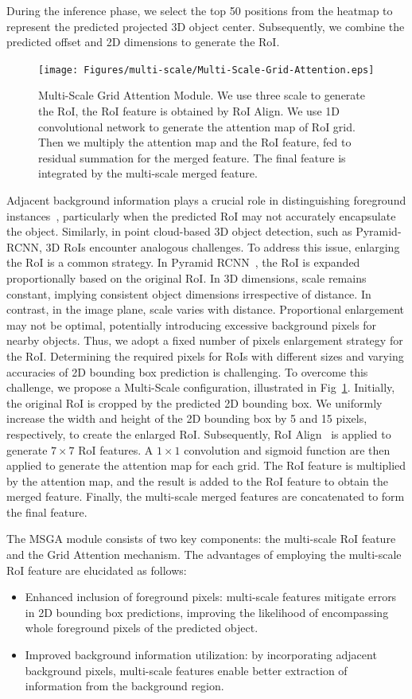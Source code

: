 \documentclass[journal]{IEEEtran}
\begin{document}
	During the inference phase, we select the top 50 positions from the heatmap to represent the predicted projected 3D object center. Subsequently, we combine the predicted offset and 2D dimensions to generate the RoI.
	\begin{figure}
	\centering
	\texttt{[image: Figures/multi-scale/Multi-Scale-Grid-Attention.eps]}
	\caption{Multi-Scale Grid Attention Module. We use three scale to generate the RoI, the RoI feature is obtained by RoI Align. We use 1D convolutional network to generate the attention map of RoI grid. Then we multiply the attention map and the RoI feature, fed to residual summation for the merged feature. The final feature is integrated by the multi-scale merged feature.} 
	\label{fig:multi-scale-grid-attention}
\end{figure}
	Adjacent background information plays a crucial role in distinguishing foreground instances~\cite{pyramid-rcnn}, particularly when the predicted RoI may not accurately encapsulate the object. Similarly, in point cloud-based 3D object detection, such as Pyramid-RCNN, 3D RoIs encounter analogous challenges. To address this issue, enlarging the RoI is a common strategy. In Pyramid RCNN~\cite{pyramid-rcnn}, the RoI is expanded proportionally based on the original RoI. In 3D dimensions, scale remains constant, implying consistent object dimensions irrespective of distance. In contrast, in the image plane, scale varies with distance. Proportional enlargement may not be optimal, potentially introducing excessive background pixels for nearby objects. Thus, we adopt a fixed number of pixels enlargement strategy for the RoI. Determining the required pixels for RoIs with different sizes and varying accuracies of 2D bounding box prediction is challenging. To overcome this challenge, we propose a Multi-Scale configuration, illustrated in Fig~\ref{fig:multi-scale-grid-attention}. Initially, the original RoI is cropped by the predicted 2D bounding box. We uniformly increase the width and height of the 2D bounding box by 5 and 15 pixels, respectively, to create the enlarged RoI. Subsequently, RoI Align~\cite{mask-rcnn} is applied to generate $7\times 7$ RoI features. A $1\times 1$ convolution and sigmoid function are then applied to generate the attention map for each grid. The RoI feature is multiplied by the attention map, and the result is added to the RoI feature to obtain the merged feature. Finally, the multi-scale merged features are concatenated to form the final feature.

	The MSGA module consists of two key components: the multi-scale RoI feature and the Grid Attention mechanism. The advantages of employing the multi-scale RoI feature are elucidated as follows:
	\begin{itemize}
		\item Enhanced inclusion of foreground pixels: multi-scale features mitigate errors in 2D bounding box predictions, improving the likelihood of encompassing whole foreground pixels of the predicted object.
		\item Improved background information utilization: by incorporating adjacent background pixels, multi-scale features enable better extraction of information from the background region.
	\end{itemize}
\end{document}
